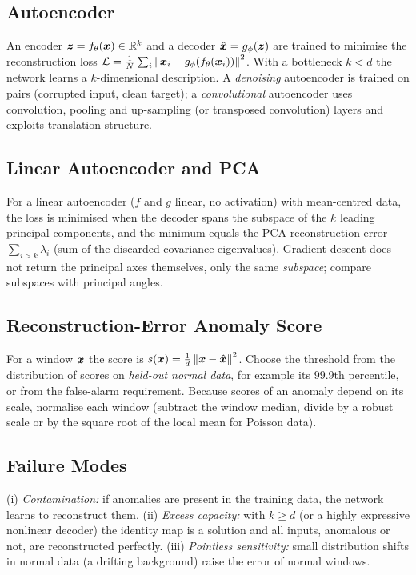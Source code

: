\documentclass[11pt,a4paper]{article}
\begin{document}
\subsection{Autoencoder}
An encoder $\bm{z}=f_\theta(\bm{x})\in\mathbb R^k$ and a decoder $\hat{\bm{x}}=g_\phi(\bm{z})$ are trained to minimise the reconstruction loss $\mathcal L=\frac1N\sum_i\left\lVert\bm{x}_i-g_\phi(f_\theta(\bm{x}_i))\right\rVert^2$. With a bottleneck $k<d$ the network learns a $k$-dimensional description. A \emph{denoising} autoencoder is trained on pairs (corrupted input, clean target); a \emph{convolutional} autoencoder uses convolution, pooling and up-sampling (or transposed convolution) layers and exploits translation structure.

\subsection{Linear Autoencoder and PCA}
For a linear autoencoder ($f$ and $g$ linear, no activation) with mean-centred data, the loss is minimised when the decoder spans the subspace of the $k$ leading principal components, and the minimum equals the PCA reconstruction error $\sum_{i>k}\lambda_i$ (sum of the discarded covariance eigenvalues). Gradient descent does not return the principal axes themselves, only the same \emph{subspace}; compare subspaces with principal angles.

\subsection{Reconstruction-Error Anomaly Score}
For a window $\bm{x}$ the score is $s(\bm{x})=\frac1d\left\lVert\bm{x}-\hat{\bm{x}}\right\rVert^2$. Choose the threshold from the distribution of scores on \emph{held-out normal data}, for example its $99.9$th percentile, or from the false-alarm requirement. Because scores of an anomaly depend on its scale, normalise each window (subtract the window median, divide by a robust scale or by the square root of the local mean for Poisson data).

\subsection{Failure Modes}
(i) \emph{Contamination:} if anomalies are present in the training data, the network learns to reconstruct them. (ii) \emph{Excess capacity:} with $k\ge d$ (or a highly expressive nonlinear decoder) the identity map is a solution and all inputs, anomalous or not, are reconstructed perfectly. (iii) \emph{Pointless sensitivity:} small distribution shifts in normal data (a drifting background) raise the error of normal windows.
\end{document}
